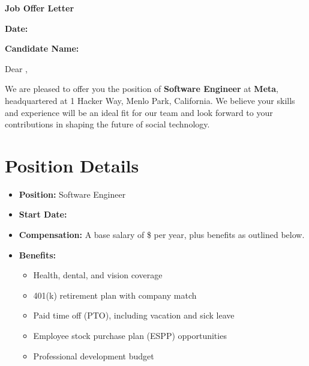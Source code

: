 \documentclass{article}
\begin{document}
\begin{center}
    \Large \textbf{Job Offer Letter}
\end{center}

\vspace{1cm}

\noindent
\textbf{Date:} \underline{\hspace{5cm}}

\vspace{0.5cm}

\noindent
\textbf{Candidate Name:} \underline{\hspace{5cm}}

\vspace{0.5cm}

Dear \underline{\hspace{5cm}},

\vspace{0.5cm}

We are pleased to offer you the position of \textbf{Software Engineer} at \textbf{Meta}, headquartered at 1 Hacker Way, Menlo Park, California. We believe your skills and experience will be an ideal fit for our team and look forward to your contributions in shaping the future of social technology.

\section*{Position Details}
\begin{itemize}
    \item \textbf{Position:} Software Engineer
    \item \textbf{Start Date:} \underline{\hspace{5cm}}
    \item \textbf{Compensation:} A base salary of \$\underline{\hspace{2cm}} per year, plus benefits as outlined below.
    \item \textbf{Benefits:}
    \begin{itemize}
        \item Health, dental, and vision coverage
        \item 401(k) retirement plan with company match
        \item Paid time off (PTO), including vacation and sick leave
        \item Employee stock purchase plan (ESPP) opportunities
        \item Professional development budget
    \end{itemize}
\end{itemize}
\end{document}
